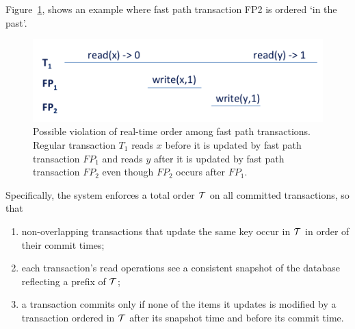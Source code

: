 {{Figure~\ref{fig:ltx-rt}, shows an example where fast path transaction FP2 is ordered `in the past'.

\begin{figure}[ht]
\includegraphics[width=\columnwidth]{figs/FP-semantics}
\caption{Possible violation of real-time order among fast path transactions. Regular transaction $T_1$
reads $x$ before it is updated by fast path transaction $FP_1$ and reads $y$ after it is updated by fast path transaction $FP_2$ even 
though $FP_2$ occurs after $FP_1$. 
}
\label{fig:ltx-rt}
\end{figure}
} %
Specifically, %
the system enforces a total order ${\cal T}$ on all committed transactions, so that
\begin{enumerate}
    \setlength{\itemsep}{0pt}
    \setlength{\parskip}{0pt}
    \setlength{\parsep}{2pt}  
\item
non-overlapping transactions 
that update the same key occur in ${\cal T}$  in order of their commit times;
\item
each  transaction's read operations see a consistent snapshot of the database reflecting 
a prefix of  ${\cal T}$; 
\item
 a transaction commits only if none of the items it updates is modified by a transaction ordered in ${\cal T}$ after
 its snapshot time and before its commit time.
 \end{enumerate}

 
}
